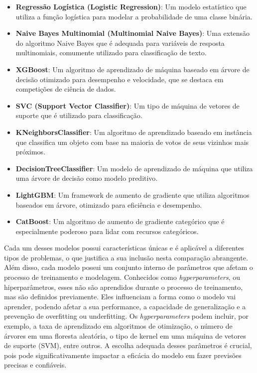 \begin{itemize}
    \item \textbf{Regressão Logística (Logistic Regression)}: Um modelo estatístico que utiliza a função logística para modelar a probabilidade de uma classe binária.
    \item \textbf{Naive Bayes Multinomial (Multinomial Naive Bayes)}: Uma extensão do algoritmo Naive Bayes que é adequada para variáveis de resposta multinomiais, comumente utilizado para classificação de texto.
    \item \textbf{XGBoost}: Um algoritmo de aprendizado de máquina baseado em árvore de decisão otimizado para desempenho e velocidade, que se destaca em competições de ciência de dados.
    \item \textbf{SVC (Support Vector Classifier)}: Um tipo de máquina de vetores de suporte que é utilizado para classificação.
    \item \textbf{KNeighborsClassifier}: Um algoritmo de aprendizado baseado em instância que classifica um objeto com base na maioria de votos de seus vizinhos mais próximos.
    \item \textbf{DecisionTreeClassifier}: Um modelo de aprendizado de máquina que utiliza uma árvore de decisão como modelo preditivo.
    \item \textbf{LightGBM}: Um framework de aumento de gradiente que utiliza algoritmos baseados em árvore, otimizado para eficiência e desempenho.
    \item \textbf{CatBoost}: Um algoritmo de aumento de gradiente categórico que é especialmente poderoso para lidar com recursos categóricos.
\end{itemize}

Cada um desses modelos possui características únicas e é aplicável a diferentes tipos de problemas, o que justifica a sua inclusão nesta comparação abrangente. Além disso, cada modelo possui um conjunto interno de parâmetros que afetam o processo de treinamento e modelagem. Conhecidos como \textit{hyperparameters}, ou hiperparâmetros, esses não são aprendidos durante o processo de treinamento, mas são definidos previamente. Eles influenciam a forma como o modelo vai aprender, podendo afetar a sua performance, a capacidade de generalização e a prevenção de overfitting ou underfitting. Os \textit{hyperparameters} podem incluir, por exemplo, a taxa de aprendizado em algoritmos de otimização, o número de árvores em uma floresta aleatória, o tipo de kernel em uma máquina de vetores de suporte (SVM), entre outros. A escolha adequada desses parâmetros é crucial, pois pode significativamente impactar a eficácia do modelo em fazer previsões precisas e confiáveis.

